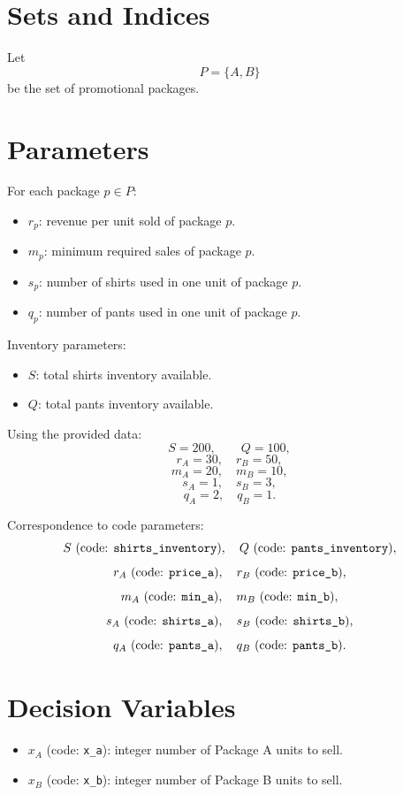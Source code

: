 \section*{Sets and Indices}

Let
\[
P=\{A,B\}
\]
be the set of promotional packages.

\section*{Parameters}

For each package \(p \in P\):
\begin{itemize}
    \item \(r_p\): revenue per unit sold of package \(p\).
    \item \(m_p\): minimum required sales of package \(p\).
    \item \(s_p\): number of shirts used in one unit of package \(p\).
    \item \(q_p\): number of pants used in one unit of package \(p\).
\end{itemize}

Inventory parameters:
\begin{itemize}
    \item \(S\): total shirts inventory available.
    \item \(Q\): total pants inventory available.
\end{itemize}

Using the provided data:
\[
S = 200, \qquad Q = 100,
\]
\[
r_A = 30,\quad r_B = 50,
\]
\[
m_A = 20,\quad m_B = 10,
\]
\[
s_A = 1,\quad s_B = 3,
\]
\[
q_A = 2,\quad q_B = 1.
\]

Correspondence to code parameters:
\[
S \text{ (code: \texttt{shirts\_inventory})}, \quad
Q \text{ (code: \texttt{pants\_inventory})},
\]
\[
r_A \text{ (code: \texttt{price\_a})}, \quad
r_B \text{ (code: \texttt{price\_b})},
\]
\[
m_A \text{ (code: \texttt{min\_a})}, \quad
m_B \text{ (code: \texttt{min\_b})},
\]
\[
s_A \text{ (code: \texttt{shirts\_a})}, \quad
s_B \text{ (code: \texttt{shirts\_b})},
\]
\[
q_A \text{ (code: \texttt{pants\_a})}, \quad
q_B \text{ (code: \texttt{pants\_b})}.
\]

\section*{Decision Variables}

\begin{itemize}
    \item \(x_A\) (code: \texttt{x\_a}): integer number of Package A units to sell.
    \item \(x_B\) (code: \texttt{x\_b}): integer number of Package B units to sell.
\end{itemize}

